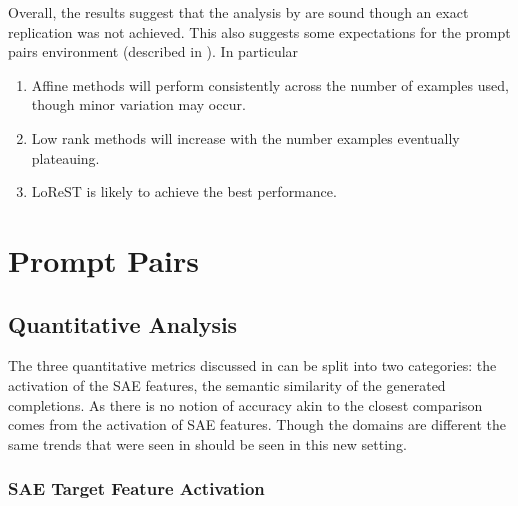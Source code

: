 Overall, the results suggest that the analysis by \citet{steering-clear} are sound though an exact replication was not achieved.
This also suggests some expectations for the prompt pairs environment (described in ).
In particular
\begin{enumerate}[nolistsep]
    \item Affine methods will perform consistently across the number of examples used, though minor variation may occur.
    \item Low rank methods will increase with the number examples eventually plateauing.
    \item LoReST is likely to achieve the best performance.
\end{enumerate}

\section{Prompt Pairs}
\label{sec:prompt-pairs-res}

\subsection{Quantitative Analysis}
\label{sec:quant}

The three quantitative metrics discussed in  can be split into two categories: the activation of the SAE features, the semantic similarity of the generated completions.
As there is no notion of accuracy akin to \citet{steering-clear} the closest comparison comes from the activation of SAE features.
Though the domains are different the same trends that were seen in  should be seen in this new setting.

\subsubsection{SAE Target Feature Activation}

